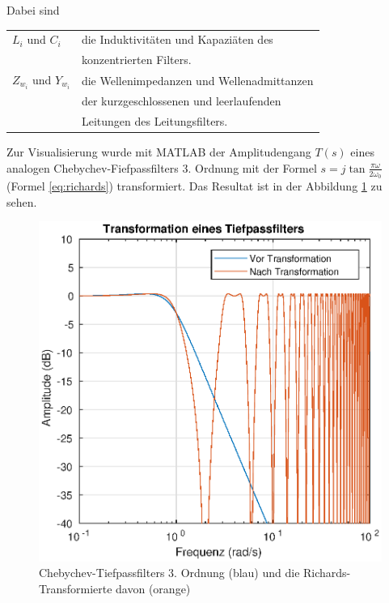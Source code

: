 Dabei sind

\begin{tabular}{ll}
    $L_i$ und $C_i$         & die Induktivit\"aten und Kapazi\"aten des \\
                            & konzentrierten Filters. \\
    $Z_{w_i}$ und $Y_{w_i}$ & die Wellenimpedanzen und Wellenadmittanzen \\
                            & der kurzgeschlossenen und leerlaufenden \\
                            & Leitungen des Leitungsfilters. \\
\end{tabular}

Zur Visualisierung wurde mit MATLAB der  Amplitudengang  $T(s)$ eines analogen
Chebychev-Fiefpassfilters 3.  Ordnung  mit  der  Formel  $s  =  j\tan\frac{\pi
\omega}{2\omega_0}$ (Formel \ref{eq:richards}) transformiert. Das Resultat ist
in der Abbildung \ref{fig:richards-example} zu sehen.

\begin{figure}
    \centering
    \includegraphics[width=\imagewidth]{images/richards-lowpass-example}
    \caption{Chebychev-Tiefpassfilters 3. Ordnung (blau) und die Richards-Transformierte davon (orange)}
    \label{fig:richards-example}
\end{figure}

